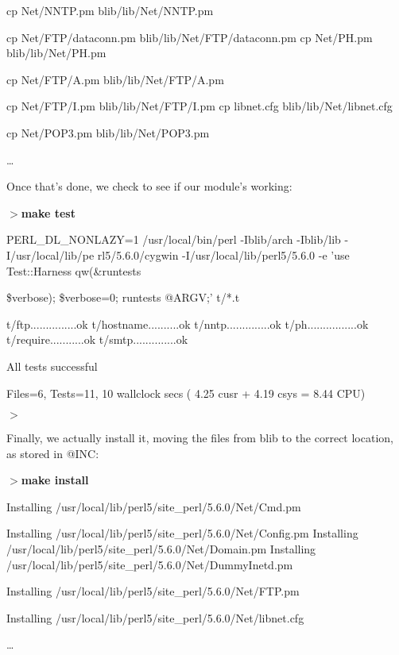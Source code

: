 \documentclass[a4paper,11pt]{book}
\begin{document}
\noindent cp Net/NNTP.pm blib/lib/Net/NNTP.pm

\noindent cp Net/FTP/dataconn.pm blib/lib/Net/FTP/dataconn.pm cp Net/PH.pm blib/lib/Net/PH.pm

\noindent cp Net/FTP/A.pm blib/lib/Net/FTP/A.pm

\noindent cp Net/FTP/I.pm blib/lib/Net/FTP/I.pm cp libnet.cfg blib/lib/Net/libnet.cfg

\noindent cp Net/POP3.pm blib/lib/Net/POP3.pm

\noindent \dots 

\noindent 

\noindent Once that's done, we check to see if our module's working:

\noindent 

\noindent $>$\textbf{make test}

\noindent PERL\_DL\_NONLAZY=1 /usr/local/bin/perl -Iblib/arch -Iblib/lib -I/usr/local/lib/pe rl5/5.6.0/cygwin -I/usr/local/lib/perl5/5.6.0 -e 'use Test::Harness qw(\&runtests

\noindent \$verbose); \$verbose=0; runtests @ARGV;' t/*.t

\noindent t/ftp...............ok t/hostname..........ok t/nntp..............ok t/ph................ok t/require...........ok t/smtp..............ok

\noindent All tests successful

\noindent Files=6, Tests=11, 10 wallclock secs ( 4.25 cusr +  4.19 csys =  8.44 CPU)

\noindent $>$

\noindent 

\noindent Finally, we actually install it, moving the files from blib to the correct location, as stored in @INC:

\noindent 

\noindent $>$\textbf{make install}

\noindent Installing /usr/local/lib/perl5/site\_perl/5.6.0/Net/Cmd.pm

\noindent Installing /usr/local/lib/perl5/site\_perl/5.6.0/Net/Config.pm Installing /usr/local/lib/perl5/site\_perl/5.6.0/Net/Domain.pm Installing /usr/local/lib/perl5/site\_perl/5.6.0/Net/DummyInetd.pm

\noindent Installing /usr/local/lib/perl5/site\_perl/5.6.0/Net/FTP.pm

\noindent Installing /usr/local/lib/perl5/site\_perl/5.6.0/Net/libnet.cfg

\noindent \dots 
\end{document}
